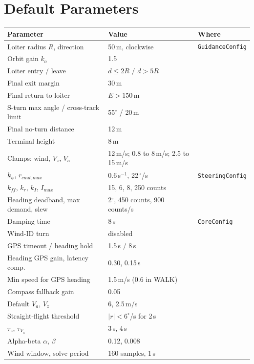 \documentclass[11pt,a4paper]{article}
\newcommand{\code}[1]{\texttt{#1}}
\begin{document}
\section{Default Parameters}
\begin{center}
\small
\renewcommand{\arraystretch}{1.1}
\begin{longtable}{lll}
\toprule
\textbf{Parameter} & \textbf{Value} & \textbf{Where} \\
\midrule
\endhead
Loiter radius $R$, direction & 50\,m, clockwise & \code{GuidanceConfig} \\
Orbit gain $k_o$ & 1.5 & \\
Loiter entry / leave & $d \le 2R$ / $d > 5R$ & \\
Final exit margin & 30\,m & \\
Final return-to-loiter & $E > 150$\,m & \\
S-turn max angle / cross-track limit & 55$^\circ$ / 20\,m & \\
Final no-turn distance & 12\,m & \\
Terminal height & 8\,m & \\
Clamps: wind, $V_z$, $V_a$ & 12\,m/s; 0.8 to 8\,m/s; 2.5 to 15\,m/s & \\
\midrule
$k_\psi$, $r_{cmd,max}$ & 0.6\,s$^{-1}$, 22\,$^\circ$/s & \code{SteeringConfig} \\
$k_{ff}$, $k_r$, $k_I$, $I_{max}$ & 15, 6, 8, 250 counts & \\
Heading deadband, max demand, slew & 2$^\circ$, 450 counts, 900 counts/s & \\
\midrule
Damping time & 8\,s & \code{CoreConfig} \\
Wind-ID turn & disabled & \\
GPS timeout / heading hold & 1.5\,s / 8\,s & \\
Heading GPS gain, latency comp. & 0.30, 0.15\,s & \\
Min speed for GPS heading & 1.5\,m/s (0.6 in WALK) & \\
Compass fallback gain & 0.05 & \\
Default $V_a$, $V_z$ & 6, 2.5\,m/s & \\
Straight-flight threshold & $|r| < 6^\circ$/s for 2\,s & \\
$\tau_z$, $\tau_{V_a}$ & 3\,s, 4\,s & \\
Alpha-beta $\alpha$, $\beta$ & 0.12, 0.008 & \\
Wind window, solve period & 160 samples, 1\,s & \\

\end{longtable}
\end{center}
\end{document}
